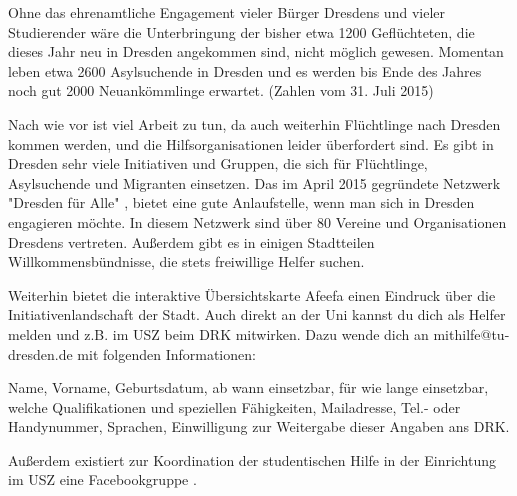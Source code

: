 Ohne das ehrenamtliche Engagement vieler Bürger Dresdens und vieler Studierender wäre die Unterbringung der bisher etwa 1200 Geflüchteten, die dieses Jahr neu in Dresden angekommen sind, nicht möglich gewesen. Momentan leben etwa 2600 Asylsuchende in Dresden und es werden bis Ende des Jahres noch gut 2000 Neuankömmlinge erwartet.  (Zahlen vom 31. Juli 2015) 

Nach wie vor ist viel Arbeit zu tun, da auch weiterhin Flüchtlinge nach Dresden kommen werden, und die Hilfsorganisationen leider überfordert sind. Es gibt in Dresden sehr viele Initiativen und Gruppen, die sich für Flüchtlinge, Asylsuchende und Migranten einsetzen. Das im April 2015 gegründete Netzwerk "Dresden für Alle" , bietet eine gute Anlaufstelle, wenn man sich in Dresden engagieren möchte. In diesem Netzwerk sind über 80 Vereine und Organisationen Dresdens vertreten. Außerdem gibt es in einigen Stadtteilen Willkommensbündnisse, die stets freiwillige Helfer suchen.

Weiterhin bietet die interaktive Übersichtskarte Afeefa  einen Eindruck über die Initiativenlandschaft der Stadt. Auch direkt an der Uni kannst du dich als Helfer melden und z.B. im USZ beim DRK mitwirken. Dazu wende dich an mithilfe@tu-dresden.de mit folgenden Informationen:

Name, Vorname, Geburtsdatum, ab wann einsetzbar, für wie lange einsetzbar, welche Qualifikationen und speziellen Fähigkeiten, Mailadresse, Tel.- oder Handynummer, Sprachen, Einwilligung zur Weitergabe dieser Angaben ans DRK.

Außerdem existiert zur Koordination der studentischen Hilfe in der Einrichtung im USZ eine Facebookgruppe .
